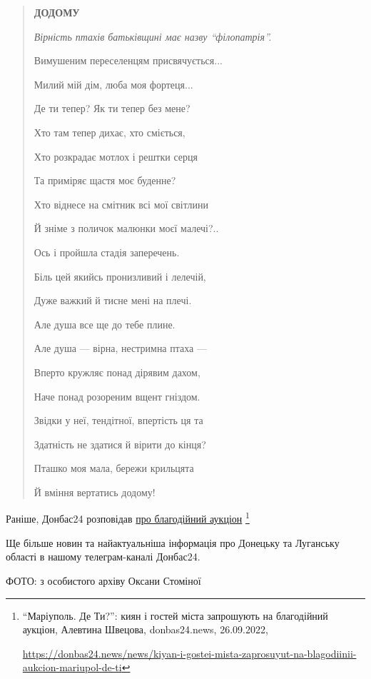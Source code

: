 \begin{quote}
\textbf{ДОДОМУ}

\begingroup
\em
Вірність птахів батьківщині має назву \enquote{філопатрія}.

Вимушеним переселенцям присвячується...
\endgroup

Милий мій дім, люба моя фортеця...

Де ти тепер? Як ти тепер без мене?

Хто там тепер дихає, хто сміється,

Хто розкрадає мотлох і рештки серця

Та приміряє щастя моє буденне?

Хто віднесе на смітник всі мої світлини

Й зніме з поличок малюнки моєї малечі?..

Ось і пройшла стадія заперечень.

Біль цей якийсь пронизливий і лелечій,

Дуже важкий й тисне мені на плечі.

Але душа все ще до тебе плине.

Але душа — вірна, нестримна птаха —

Вперто кружляє понад дірявим дахом,

Наче понад розореним вщент гніздом.

Звідки у неї, тендітної, впертість ця та

Здатність не здатися й вірити до кінця?

Пташко моя мала, бережи крильцята

Й вміння вертатись додому!
\end{quote}

Раніше, Донбас24 розповідав \href{https://donbas24.news/news/kiyan-i-gostei-mista-zaprosuyut-na-blagodiinii-aukcion-mariupol-de-ti}{про благодійний аукціон}%
\footnote{\enquote{Маріуполь. Де Ти?}: киян і гостей міста запрошують на благодійний аукціон, Алевтина Швецова, donbas24.news, 26.09.2022, \par\url{https://donbas24.news/news/kiyan-i-gostei-mista-zaprosuyut-na-blagodiinii-aukcion-mariupol-de-ti}}

Ще більше новин та найактуальніша інформація про Донецьку та Луганську області
в нашому телеграм-каналі Донбас24.

ФОТО: з особистого архіву Оксани Стоміної

